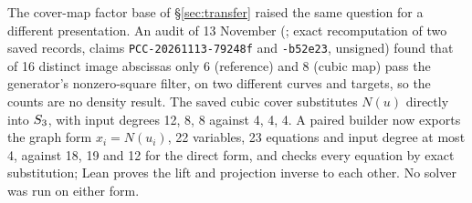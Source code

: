 The cover-map factor base of \S\ref{sec:transfer} raised the same question
for a different presentation. An audit of 13 November
(; exact
recomputation of two saved records, claims \texttt{PCC-20261113-79248f} and
\texttt{-b52e23}, unsigned) found that of 16 distinct image abscissas only 6
(reference) and 8 (cubic map) pass the generator's nonzero-square filter, on
two different curves and targets, so the counts are no density result. The
saved cubic cover substitutes $N(u)$ directly into $S_{3}$, with input
degrees 12, 8, 8 against 4, 4, 4. A paired builder now exports the graph
form $x_i=N(u_i)$, 22 variables, 23 equations and input degree at most 4,
against 18, 19 and 12 for the direct form, and checks every equation by
exact substitution; Lean proves the lift and projection inverse to each
other. No solver was run on either form.

